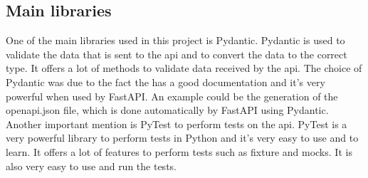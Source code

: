 \subsection{Main libraries}
One of the main libraries used in this project is Pydantic. Pydantic is used to validate the data that is sent to the api and to convert the data to the correct type. It offers a lot of methods to validate data received by the api. The choice of Pydantic was due to the fact the has a good documentation and it's very powerful when used by FastAPI. An example could be the generation of the openapi.json file, which is done automatically by FastAPI using Pydantic. \\
Another important mention is PyTest to perform tests on the api. PyTest is a very powerful library to perform tests in Python and it's very easy to use and to learn. It offers a lot of features to perform tests such as fixture and mocks. It is also very easy to use and run the tests.